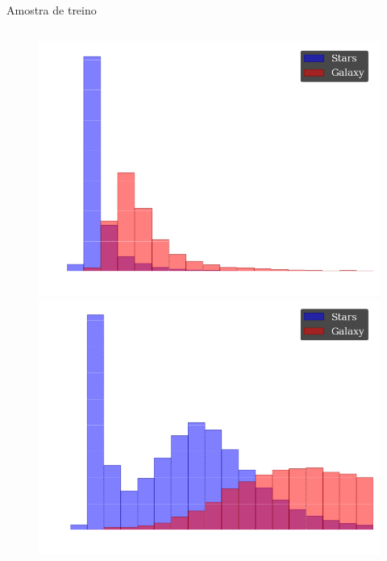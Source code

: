 \begin{frame}[c]{Amostra de treino}
    \begin{columns}[c]
        \begin{column}{0.48\textwidth}
            \vspace{0.5cm} %
            \hspace{0.5cm} %
            \begin{figure}
                \includegraphics[width=\linewidth, height=0.44\textheight, keepaspectratio]{images/distribution_of_stars_and_galaxies.png}
                \vspace{0.5cm}
                \includegraphics[width=\linewidth, height=0.44\textheight, keepaspectratio]{images/distribution_of_stars_and_galaxies_u.png}

\end{figure}
\end{column}
\end{columns}
\end{frame}
